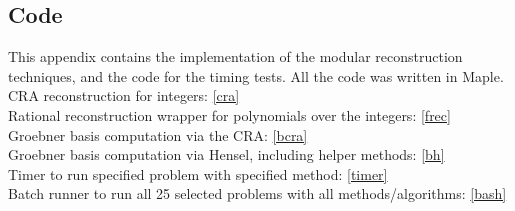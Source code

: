 \documentclass[letterpaper,12pt,titlepage,oneside,final]{book}
\begin{document}
\begin{appendices}
\chapter{Code}\label{elCode}

This appendix contains the implementation of the modular reconstruction techniques, and the code for the timing tests.  All the code was written in Maple.
\\
\noindent CRA reconstruction for integers: \hfill \ref{cra}\\
Rational reconstruction wrapper for polynomials over the integers: \hfill \ref{frec}\\
Groebner basis computation via the CRA: \hfill \ref{bcra}\\
Groebner basis computation via Hensel, including helper methods: \hfill \ref{bh}\\
Timer to run specified problem with specified method: \hfill \ref{timer}\\
Batch runner to run all 25 selected problems with all methods/algorithms: \hfill \ref{bash}\\

\newpage 
\singlespacing

\doublespacing

\singlespacing

\doublespacing

\singlespacing

\doublespacing

\singlespacing

\doublespacing

\singlespacing

\doublespacing

\singlespacing

\doublespacing


\end{appendices}
\end{document}
